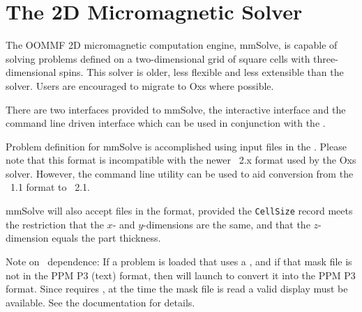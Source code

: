\chapter{The 2D Micromagnetic Solver}\label{sec:mmsolve}%

\setcounter{msoldsecnumdepth}{\value{secnumdepth}}
\setcounter{secnumdepth}{4}


The OOMMF 2D micromagnetic computation engine, mmSolve, is capable of
solving problems defined on a two-dimensional grid of square cells with
three-dimensional spins.  This solver is older, less flexible and less
extensible than the  solver.
Users are encouraged to migrate to Oxs where possible.

There are two interfaces provided to mmSolve, the interactive
interface and the command line driven
interface which can be used in conjunction with the
.

Problem definition for mmSolve is accomplished using input files in the
.
Please note that this format is incompatible with the newer \MIF~2.x
format used by the Oxs solver.  However, the command line utility
 can be used to aid conversion from the
\MIF~1.1 format to \MIF~2.1.

mmSolve will also accept files in the  format, provided the
\texttt{CellSize} record meets the restriction that the $x$- and
$y$-dimensions are the same, and that the $z$-dimension equals the part
thickness.

Note on \Tk\ dependence: If a problem is loaded that uses a
{}, and
if that mask file is not in the PPM P3 (text) format, then
 will launch {} to convert it into
the PPM P3 format.  Since 
requires \Tk, at the
time the mask file is read a valid display must be available.  See the
 documentation for details.

